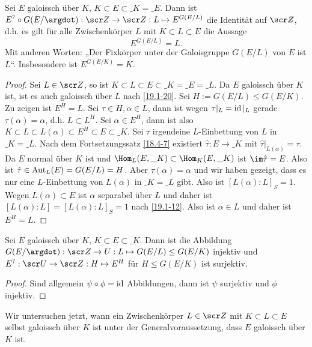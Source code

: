 \begin{st} \label{19.4-13}
	Sei $E$ galoissch über $K$, $K \subset E \subset \_K = \_E$.
	Dann ist $E^? \circ G(E / \argdot) : \scr Z \to \scr Z : L \mapsto E^{G(E / L)}$ die Identität auf $\scr Z$, d.h. es gilt für alle Zwischenkörper $L$ mit $K \subset L \subset E$ die Aussage
	\[
		E^{G(E / L)} = L.
	\]
	Mit anderen Worten: „Der Fixkörper unter der Galoisgruppe $G(E / L)$ von $E$ ist $L$“.
	Insbesondere ist $E^{G(E/K)} = K$.
	\begin{proof}
		Sei $L \in \scr Z$, so ist $K \subset L \subset E \subset \_K = \_E = \_L$.
		Da $E$ galoissch über $K$ ist, ist es auch galoissch über $L$ nach \ref{19.1-20}.
		Sei $H := G(E / L) \le G(E / K)$.
		Zu zeigen ist $E^H = L$.
		Sei $\tau \in H, \alpha \in L$, dann ist wegen $\tau|_L = \operatorname{id}|_L$ gerade $\tau(\alpha) = \alpha$, d.h. $L \subset L^H$.
		Sei $\alpha \in E^H$, dann ist also $K \subset L \subset L(\alpha) \subset E^H \subset E \subset \_K$.
		Sei $\tau$ irgendeine $L$-Einbettung von $L$ in $\_K = \_L$.
		Nach dem Fortsetzungssatz \ref{18.4-7} existiert $\hat \tau: E \to \_K$ mit $\hat \tau|_{L(\alpha)} = \tau$.
		Da $E$ normal über $K$ ist und $\Hom_L(E, \_K) \subset \Hom_K (E, \_K)$ ist $\im \hat \tau = E$.
		Also ist $\hat \tau \in \operatorname{Aut}_L(E) = G(E / L) = H$.
		Aber $\tau(\alpha) = \alpha$ und wir haben gezeigt, dass es nur eine $L$-Einbettung von $L(\alpha)$ in $\_K = \_L$ gibt.
		Also ist $[L(\alpha) : L]_S = 1$.
		Wegen $L(\alpha) \subset E$ ist $\alpha$ separabel über $L$ und daher ist $[L(\alpha) : L] = [L(\alpha) : L]_S = 1$ nach \ref{19.1-12}.
		Also ist $\alpha \in L$ und daher ist $E^H = L$.
	\end{proof}
\end{st}

\begin{kor} \label{19.4-14}
	Sei $E$ galoissch über $K$, $K \subset E \subset \_K$.
	Dann ist die Abbildung $G(E / \argdot): \scr Z \to U : L \mapsto G(E / L) \le G(E / K)$ injektiv und $E^? : \scr U \to \scr Z : H \mapsto E^H$ für $H \le G(E / K)$ ist surjektiv.
	\begin{proof}
		Sind allgemein $\psi \circ \phi = \operatorname{id}$ Abbildungen, dann ist $\psi$ surjektiv und $\phi$ injektiv.
	\end{proof}
\end{kor}

Wir untersuchen jetzt, wann ein Zwischenkörper $L \in \scr Z$ mit $K \subset L \subset E$ selbst galoissch über $K$ ist unter der Generalvoraussetzung, dass $E$ galoissch über $K$ ist.

